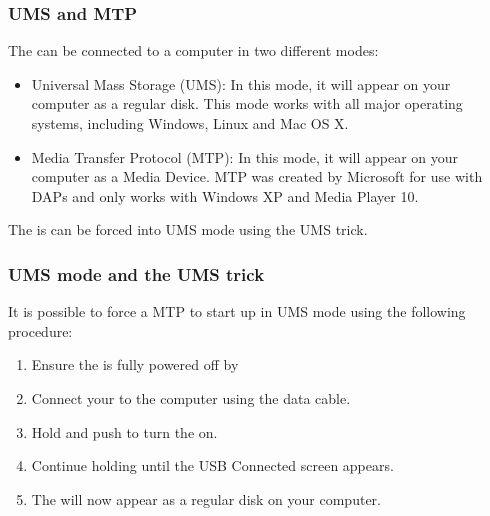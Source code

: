 \subsubsection{UMS and MTP}
The \playertype{} can be connected to a computer in two different modes:
\begin{itemize}
  \item Universal Mass Storage (UMS): In this mode, it will appear on your computer as a regular disk. This mode works with all major operating systems, including Windows, Linux and Mac OS X.
  \item Media Transfer Protocol (MTP): In this mode, it will appear on your computer as a Media Device. MTP was created by Microsoft for use with DAPs and only works with Windows XP and Media Player 10.
\end{itemize}
The \playerlongtype{} is  can be forced into UMS mode using the UMS trick.

\subsubsection{UMS mode and the UMS trick}
It is possible to force a MTP \playertype{} to start up in UMS mode using the following procedure:
\begin{enumerate}
  \item Ensure the \dap{} is fully powered off by 
  \item Connect your \playertype{} to the computer using the data cable.
  \item Hold \ButtonRight{} and push \ButtonPower{} to turn the \dap{} on.
  \item Continue holding \ButtonRight{} until the USB Connected screen appears.
  \item The \dap{} will now appear as a regular disk on your computer.
\end{enumerate}

